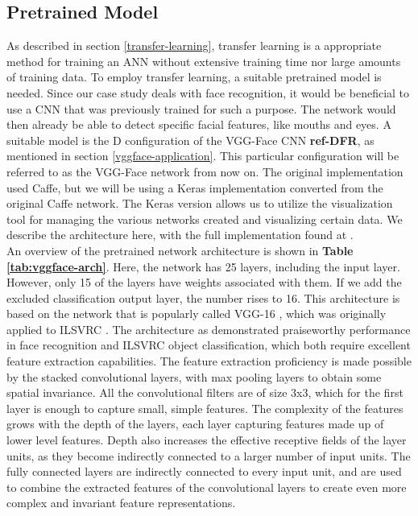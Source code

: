 \subsection{Pretrained Model}


As described in section \ref{transfer-learning}, transfer learning is a appropriate method for training an ANN without extensive training time nor large amounts of training data. To employ transfer learning, a suitable pretrained model is needed. Since our case study deals with face recognition, it would be beneficial to use a CNN that was previously trained for such a purpose. The network would then already be able to detect specific facial features, like mouths and eyes. A suitable model is the D configuration of the VGG-Face CNN \textbf{ref-DFR}, as mentioned in section \ref{vggface-application}. This particular configuration will be referred to as the VGG-Face network from now on. The original implementation used Caffe, but we will be using a Keras implementation converted from the original Caffe network. The Keras version allows us to utilize the visualization tool for managing the various networks created and visualizing certain data. We describe the architecture here, with the full implementation found at \cite{vggface-github}. \\

\noindent An overview of the pretrained network architecture is shown in \textbf{Table \ref{tab:vggface-arch}}. Here, the network has 25 layers, including the input layer. However, only 15 of the layers have weights associated with them. If we add the excluded classification output layer, the number rises to 16. This architecture is based on the network that is popularly called VGG-16 \cite{vgg}, which was originally applied to ILSVRC \cite{imagenet}. The architecture as demonstrated praiseworthy performance in face recognition and ILSVRC object classification, which both require excellent feature extraction capabilities. The feature extraction proficiency is made possible by the stacked convolutional layers, with max pooling layers to obtain some spatial invariance. All the convolutional filters are of size 3x3, which for the first layer is enough to capture small, simple features. The complexity of the features grows with the depth of the layers, each layer capturing features made up of lower level features. Depth also increases the effective receptive fields of the layer units, as they become indirectly connected to a larger number of input units. The fully connected layers are indirectly connected to every input unit, and are used to combine the extracted features of the convolutional layers to create even more complex and invariant feature representations. \\


